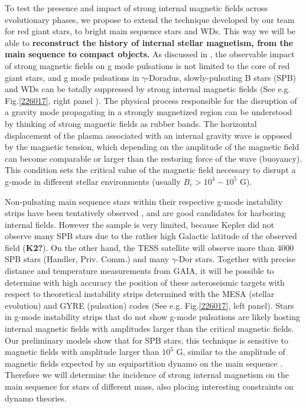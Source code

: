 To test the presence and impact of strong internal magnetic fields across evolutionary phases,
we propose to extend the technique developed by our team for red giant stars, to bright main sequence stars and WDs. This way we will be able to \textbf{reconstruct the history of internal stellar magnetism, from the main sequence to compact objects.} As discussed in \citet{Cantiello_2016}, the observable impact of strong magnetic fields on g mode pulsations is not limited to the core of red giant stars, and
 g mode pulsations in $\gamma$-Doradus, slowly-pulsating B stars (SPB) and WDs can be totally suppressed by strong internal magnetic fields (See e.g. Fig.\ref{226017}, right panel ). The physical process responsible for the disruption of a gravity mode propagating in a strongly magnetized region can be understood by thinking of strong magnetic fields as rubber bands. The horizontal displacement of the plasma associated with an internal gravity wave is opposed by the magnetic tension, which depending on the amplitude of the magnetic field can become comparable or larger than the restoring force of the wave (buoyancy). This condition sets the critical value of the magnetic field necessary to disrupt a g-mode in different stellar environments (usually $B_c > 10^4-10^5$ G). 

Non-pulsating main sequence stars within their respective g-mode instability strips have been tentatively observed \citep{Balona_2011}, and are good candidates for harboring internal fields.
However the sample is very limited, because Kepler did not observe many SPB stars due to the rather high Galactic latitude of the observed field (\textbf{K2?}). On the other hand, the TESS satellite will observe more than 4000 SPB stars (Handler, Priv. Comm.) and many $\gamma$-Dor stars. Together with precise distance and temperature measurements from GAIA, it will be possible to determine with high accuracy the position of these asteroseismic targets with respect to theoretical instability strips determined with the MESA (stellar evolution) and GYRE (pulsation) codes (See e.g. Fig.\ref{226017}, left panel).
Stars in g-mode instability strips that do not show g-mode pulsations are likely hosting internal magnetic fields with amplitudes larger than the critical
magnetic fields. Our preliminary models show that for SPB stars, this technique is sensitive to magnetic fields with amplitude larger than $10^5$ G,
similar to the amplitude of magnetic fields expected by an equipartition dynamo on the main sequence \citep[See e.g.][]{Featherstone_2009,Augustson_2016}. Therefore we will determine the incidence of strong internal magnetism on the main sequence for stars of different mass, also placing interesting constraints on dynamo theories.

